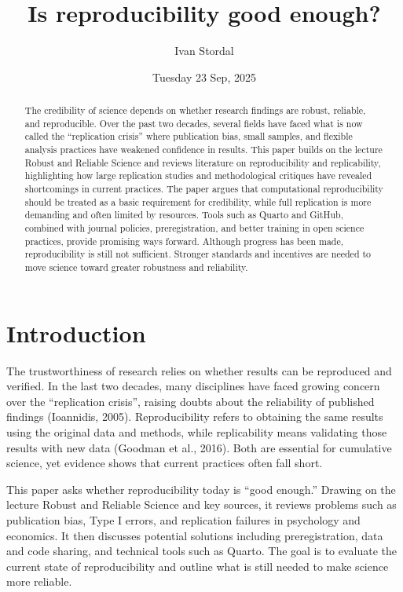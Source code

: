 \documentclass[
  a4paper,
]{article}
\title{Is reproducibility good enough?}
\author{Ivan Stordal}
\date{Tuesday 23 Sep, 2025}
\begin{document}
\maketitle
\begin{abstract}
The credibility of science depends on whether research findings are
robust, reliable, and reproducible. Over the past two decades, several
fields have faced what is now called the ``replication crisis'' where
publication bias, small samples, and flexible analysis practices have
weakened confidence in results. This paper builds on the lecture Robust
and Reliable Science and reviews literature on reproducibility and
replicability, highlighting how large replication studies and
methodological critiques have revealed shortcomings in current
practices. The paper argues that computational reproducibility should be
treated as a basic requirement for credibility, while full replication
is more demanding and often limited by resources. Tools such as Quarto
and GitHub, combined with journal policies, preregistration, and better
training in open science practices, provide promising ways forward.
Although progress has been made, reproducibility is still not
sufficient. Stronger standards and incentives are needed to move science
toward greater robustness and reliability.
\end{abstract}


\section{Introduction}\label{introduction}

The trustworthiness of research relies on whether results can be
reproduced and verified. In the last two decades, many disciplines have
faced growing concern over the ``replication crisis'', raising doubts
about the reliability of published findings (Ioannidis, 2005).
Reproducibility refers to obtaining the same results using the original
data and methods, while replicability means validating those results
with new data (Goodman et al., 2016). Both are essential for cumulative
science, yet evidence shows that current practices often fall short.

This paper asks whether reproducibility today is ``good enough.''
Drawing on the lecture Robust and Reliable Science and key sources, it
reviews problems such as publication bias, Type I errors, and
replication failures in psychology and economics. It then discusses
potential solutions including preregistration, data and code sharing,
and technical tools such as Quarto. The goal is to evaluate the current
state of reproducibility and outline what is still needed to make
science more reliable.
\end{document}
